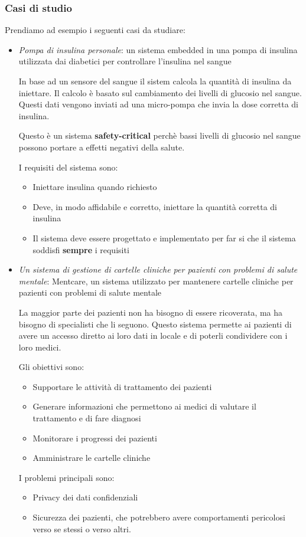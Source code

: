 \documentclass[a4paper]{article}
\begin{document}
\subsubsection{Casi di studio}
Prendiamo ad esempio i seguenti casi da studiare:
\begin{itemize}
  \item \textit{Pompa di insulina personale}: un sistema embedded in una pompa di insulina
    utilizzata dai diabetici per controllare l'insulina nel sangue

    \vspace{1em}
    \noindent
    In base ad un sensore del sangue il sistem calcola la quantità di insulina da iniettare.
    Il calcolo è basato sul cambiamento dei livelli di glucosio nel sangue. Questi dati
    vengono inviati ad una micro-pompa che invia la dose corretta di insulina.

    Questo è un sistema \textbf{safety-critical} perchè bassi livelli di glucosio nel
    sangue possono portare a effetti negativi della salute.

    I requisiti del sistema sono:
    \begin{itemize}
      \item Iniettare insulina quando richiesto
      \item Deve, in modo affidabile e corretto, iniettare la quantità corretta di insulina
      \item Il sistema deve essere progettato e implementato per far si che il sistema
        soddisfi \textbf{sempre} i requisiti
    \end{itemize}

  \item \textit{Un sistema di gestione di cartelle cliniche per pazienti con problemi di
    salute mentale}:
    Mentcare, un sistema utilizzato per mantenere cartelle cliniche per pazienti con
    problemi di salute mentale

    \vspace{1em}
    \noindent
    La maggior parte dei pazienti non ha bisogno di essere ricoverata, ma ha bisogno di
    specialisti che li seguono. Questo sistema permette ai pazienti di avere un accesso
    diretto ai loro dati in locale e di poterli condividere con i loro medici.

    Gli obiettivi sono:
    \begin{itemize}
      \item Supportare le attività di trattamento dei pazienti
      \item Generare informazioni che permettono ai medici di valutare il trattamento
        e di fare diagnosi
      \item Monitorare i progressi dei pazienti
      \item Amministrare le cartelle cliniche
    \end{itemize}
    I problemi principali sono:
    \begin{itemize}
      \item Privacy dei dati confidenziali
      \item Sicurezza dei pazienti, che potrebbero avere comportamenti pericolosi verso
        se stessi o verso altri.
    \end{itemize}


\end{itemize}
\end{document}
